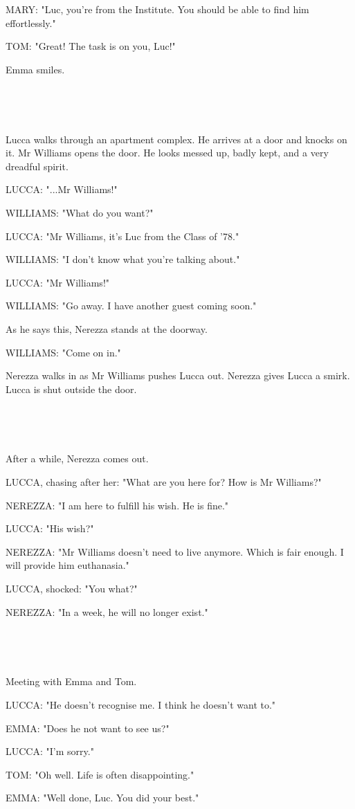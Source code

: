 \documentclass[11pt]{article}
\begin{document}
MARY: "Luc, you're from the Institute. 
You should be able to find him effortlessly."

TOM: "Great! The task is on you, Luc!"

Emma smiles.

\ 

\ 

Lucca walks through an apartment complex. 
He arrives at a door and knocks on it.
Mr Williams opens the door. 
He looks messed up, badly kept, and a very dreadful spirit.

LUCCA: "...Mr Williams!"

WILLIAMS: "What do you want?"

LUCCA: "Mr Williams, it's Luc from the Class of '78."

WILLIAMS: "I don't know what you're talking about."

LUCCA: "Mr Williams!"

WILLIAMS: "Go away. I have another guest coming soon."

As he says this, Nerezza stands at the doorway.

WILLIAMS: "Come on in."

Nerezza walks in as Mr Williams pushes Lucca out.
Nerezza gives Lucca a smirk.
Lucca is shut outside the door.

\ 

\ 

After a while, Nerezza comes out.

LUCCA, chasing after her: "What are you here for? How is Mr Williams?"

NEREZZA: "I am here to fulfill his wish.
He is fine."

LUCCA: "His wish?"

NEREZZA: "Mr Williams doesn't need to live anymore.
Which is fair enough.
I will provide him euthanasia."

LUCCA, shocked: "You what?"

NEREZZA: "In a week, he will no longer exist."

\ 

\ 

Meeting with Emma and Tom. 

LUCCA: "He doesn't recognise me.
I think he doesn't want to."

EMMA: "Does he not want to see us?"

LUCCA: "I'm sorry."

TOM: "Oh well. Life is often disappointing."

EMMA: "Well done, Luc. You did your best."
\end{document}
